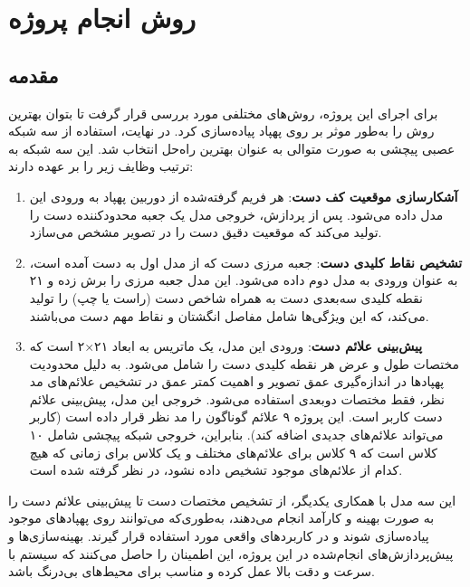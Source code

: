 \chapter{روش انجام پروژه}
\section{مقدمه}
برای اجرای این پروژه، روش‌های مختلفی مورد بررسی قرار گرفت تا بتوان بهترین روش را به‌طور موثر  بر روی پهپاد پیاده‌سازی کرد. در نهایت، استفاده از سه شبکه عصبی پیچشی به صورت متوالی به عنوان بهترین راه‌حل انتخاب شد. این سه شبکه به ترتیب وظایف زیر را بر عهده دارند:

\begin{enumerate}
    \item \textbf{آشکارسازی موقعیت کف دست}: هر فریم گرفته‌شده از دوربین پهپاد به ورودی این مدل داده می‌شود. پس از پردازش، خروجی مدل یک جعبه محدودکننده  دست را تولید می‌کند که موقعیت دقیق دست را در تصویر مشخص می‌سازد.
    
    \item \textbf{تشخیص نقاط کلیدی دست}: جعبه مرزی دست که از مدل اول به دست آمده است، به عنوان ورودی به مدل دوم داده می‌شود. این مدل جعبه مرزی را برش زده و ۲۱ نقطه کلیدی سه‌بعدی دست به همراه شاخص دست (راست یا چپ) را تولید می‌کند، که این ویژگی‌ها شامل مفاصل انگشتان و نقاط مهم دست می‌باشند.
    
    \item \textbf{پیش‌بینی علائم دست}: ورودی این مدل، یک ماتریس به ابعاد ۲۱×۲ است که مختصات طول و عرض هر نقطه کلیدی دست را شامل می‌شود. به دلیل محدودیت پهپادها در اندازه‌گیری عمق تصویر و اهمیت کمتر عمق در تشخیص علائم‌های مد نظر، فقط مختصات دوبعدی استفاده می‌شود. خروجی این مدل، پیش‌بینی علائم دست کاربر است. این پروژه ۹ علائم گوناگون را مد نظر قرار داده است (کاربر می‌تواند علائم‌های جدیدی اضافه کند). بنابراین، خروجی شبکه پیچشی شامل ۱۰ کلاس است که ۹ کلاس برای علائم‌های مختلف و یک کلاس برای زمانی که هیچ کدام از علائم‌های موجود تشخیص داده نشود، در نظر گرفته شده است.
\end{enumerate}

این سه مدل با همکاری یکدیگر، از تشخیص  مختصات دست تا پیش‌بینی علائم دست را به صورت بهینه و کارآمد انجام می‌دهند، به‌طوری‌که می‌توانند روی پهپادهای موجود پیاده‌سازی شوند و در کاربردهای واقعی مورد استفاده قرار گیرند. بهینه‌سازی‌ها و پیش‌پردازش‌های انجام‌شده در این پروژه،  این اطمینان را حاصل می‌کنند که سیستم با سرعت و دقت بالا عمل کرده و مناسب برای محیط‌های بی‌درنگ باشد.


